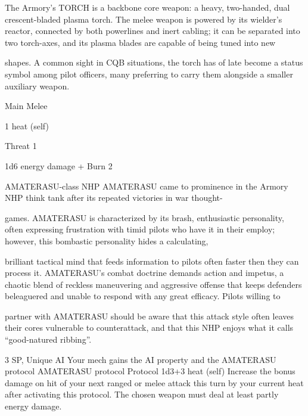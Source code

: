 The Armory’s TORCH is a backbone core weapon: a heavy, two-handed, dual crescent-bladed plasma
torch. The melee weapon is powered by its wielder’s reactor, connected by both powerlines and inert
cabling; it can be separated into two torch-axes, and its plasma blades are capable of being tuned into new

shapes. A common sight in CQB situations, the torch has of late become a status symbol among pilot
officers, many preferring to carry them alongside a smaller auxiliary weapon.

Main Melee

1 heat (self)

Threat 1

1d6 energy damage + Burn 2


AMATERASU-class NHP
AMATERASU came to prominence in the Armory NHP think tank after its repeated victories in war thought-

games. AMATERASU is characterized by its brash, enthusiastic personality, often expressing frustration
with timid pilots who have it in their employ; however, this bombastic personality hides a calculating,

brilliant tactical mind that feeds information to pilots often faster then they can process it. AMATERASU’s
combat doctrine demands action and impetus, a chaotic blend of reckless maneuvering and aggressive
offense that keeps defenders beleaguered and unable to respond with any great efficacy. Pilots willing to

partner with AMATERASU should be aware that this attack style often leaves their cores vulnerable to
counterattack, and that this NHP enjoys what it calls “good-natured ribbing”.

3 SP, Unique
AI
Your mech gains the AI property and the AMATERASU protocol
	        AMATERASU protocol
	        Protocol
	        1d3+3 heat (self)
         Increase the bonus damage on hit of your next ranged or melee attack this turn by your
         current heat after activating this protocol. The chosen weapon must deal at least partly
         energy damage.
